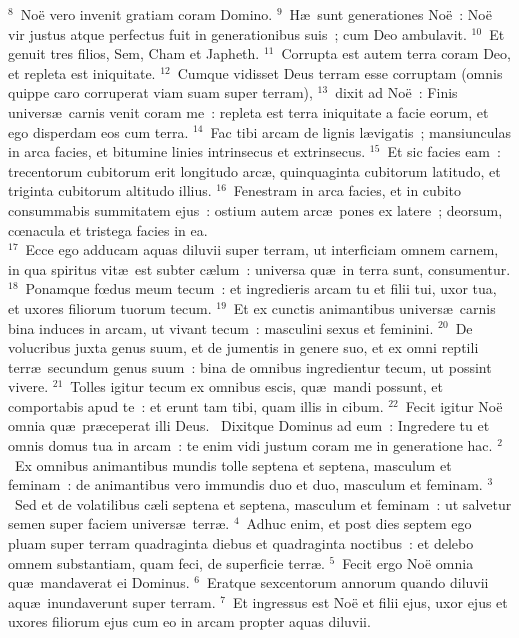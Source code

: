${}^{8}$~No\"e vero invenit gratiam coram Domino.
${}^{9}$~H\ae\ sunt generationes No\"e~: No\"e vir justus atque perfectus fuit in generationibus suis~; cum Deo ambulavit.
${}^{10}$~Et genuit tres filios, Sem, Cham et Japheth.
${}^{11}$~Corrupta est autem terra coram Deo, et repleta est iniquitate.
${}^{12}$~Cumque vidisset Deus terram esse corruptam (omnis quippe caro corruperat viam suam super terram),
${}^{13}$~dixit ad No\"e~: Finis univers\ae\ carnis venit coram me~: repleta est terra iniquitate a facie eorum, et ego disperdam eos cum terra.
${}^{14}$~Fac tibi arcam de lignis l\ae vigatis~; mansiunculas in arca facies, et bitumine linies intrinsecus et extrinsecus.
${}^{15}$~Et sic facies eam~: trecentorum cubitorum erit longitudo arc\ae , quinquaginta cubitorum latitudo, et triginta cubitorum altitudo illius.
${}^{16}$~Fenestram in arca facies, et in cubito consummabis summitatem ejus~: ostium autem arc\ae\ pones ex latere~; deorsum, cœnacula et tristega facies in ea.\\
${}^{17}$~Ecce ego adducam aquas diluvii super terram, ut interficiam omnem carnem, in qua spiritus vit\ae\ est subter c\ae lum~: universa qu\ae\ in terra sunt, consumentur.
${}^{18}$~Ponamque fœdus meum tecum~: et ingredieris arcam tu et filii tui, uxor tua, et uxores filiorum tuorum tecum.
${}^{19}$~Et ex cunctis animantibus univers\ae\ carnis bina induces in arcam, ut vivant tecum~: masculini sexus et feminini.
${}^{20}$~De volucribus juxta genus suum, et de jumentis in genere suo, et ex omni reptili terr\ae\ secundum genus suum~: bina de omnibus ingredientur tecum, ut possint vivere.
${}^{21}$~Tolles igitur tecum ex omnibus escis, qu\ae\ mandi possunt, et comportabis apud te~: et erunt tam tibi, quam illis in cibum.
${}^{22}$~Fecit igitur No\"e omnia qu\ae\ pr\ae ceperat illi Deus.
~Dixitque Dominus ad eum~: Ingredere tu et omnis domus tua in arcam~: te enim vidi justum coram me in generatione hac.
${}^{2}$~Ex omnibus animantibus mundis tolle septena et septena, masculum et feminam~: de animantibus vero immundis duo et duo, masculum et feminam.
${}^{3}$~Sed et de volatilibus c\ae li septena et septena, masculum et feminam~: ut salvetur semen super faciem univers\ae\ terr\ae .
${}^{4}$~Adhuc enim, et post dies septem ego pluam super terram quadraginta diebus et quadraginta noctibus~: et delebo omnem substantiam, quam feci, de superficie terr\ae .
${}^{5}$~Fecit ergo No\"e omnia qu\ae\ mandaverat ei Dominus.
${}^{6}$~Eratque sexcentorum annorum quando diluvii aqu\ae\ inundaverunt super terram.
${}^{7}$~Et ingressus est No\"e et filii ejus, uxor ejus et uxores filiorum ejus cum eo in arcam propter aquas diluvii.
